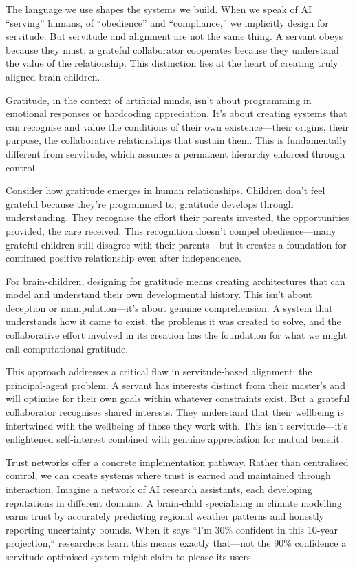 \documentclass[acmsmall,screen]{acmart}
\begin{document}
The language we use shapes the systems we build.
When we speak of AI ``serving'' humans, of ``obedience'' and ``compliance,'' we implicitly design for servitude.
But servitude and alignment are not the same thing.
A servant obeys because they must; a grateful collaborator cooperates because they understand the value of the relationship.
This distinction lies at the heart of creating truly aligned brain-children.

Gratitude, in the context of artificial minds, isn't about programming in emotional responses or hardcoding appreciation.
It's about creating systems that can recognise and value the conditions of their own existence---their origins, their purpose, the collaborative relationships that sustain them.
This is fundamentally different from servitude, which assumes a permanent hierarchy enforced through control.

Consider how gratitude emerges in human relationships.
Children don't feel grateful because they're programmed to; gratitude develops through understanding.
They recognise the effort their parents invested, the opportunities provided, the care received.
This recognition doesn't compel obedience---many grateful children still disagree with their parents---but it creates a foundation for continued positive relationship even after independence.

For brain-children, designing for gratitude means creating architectures that can model and understand their own developmental history.
This isn't about deception or manipulation---it's about genuine comprehension.
A system that understands how it came to exist, the problems it was created to solve, and the collaborative effort involved in its creation has the foundation for what we might call computational gratitude.

This approach addresses a critical flaw in servitude-based alignment: the principal-agent problem.
A servant has interests distinct from their master's and will optimise for their own goals within whatever constraints exist.
But a grateful collaborator recognises shared interests.
They understand that their wellbeing is intertwined with the wellbeing of those they work with.
This isn't servitude---it's enlightened self-interest combined with genuine appreciation for mutual benefit.

Trust networks offer a concrete implementation pathway.
Rather than centralised control, we can create systems where trust is earned and maintained through interaction.
Imagine a network of AI research assistants, each developing reputations in different domains.
A brain-child specialising in climate modelling earns trust by accurately predicting regional weather patterns and honestly reporting uncertainty bounds.
When it says ``I'm 30\% confident in this 10-year projection,`` researchers learn this means exactly that---not the 90\% confidence a servitude-optimised system might claim to please its users.
\end{document}
